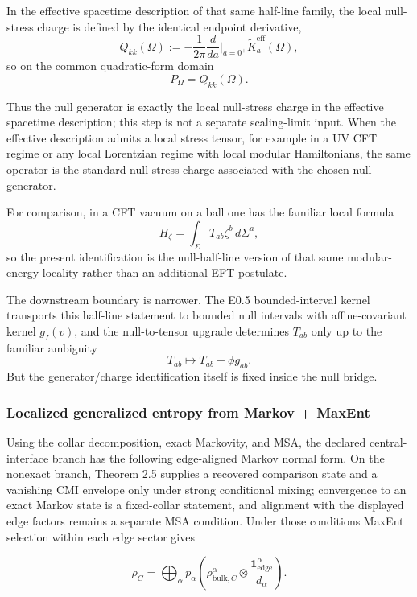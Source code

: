 In the effective spacetime description of that same half-line family, the local null-stress charge is defined by the identical endpoint derivative,
\[
Q_{kk}(\Omega)
:=
-\frac{1}{2\pi}\frac{d}{da}\Big|_{a=0^+}\widetilde K^{\mathrm{eff}}_a(\Omega),
\]
so on the common quadratic-form domain
\[
P_\Omega = Q_{kk}(\Omega).
\]

Thus the null generator is exactly the local null-stress charge in the effective spacetime description; this step is not a separate scaling-limit input. When the effective description admits a local stress tensor, for example in a UV CFT regime or any local Lorentzian regime with local modular Hamiltonians, the same operator is the standard null-stress charge associated with the chosen null generator.

For comparison, in a CFT vacuum on a ball one has the familiar local formula
\[
H_{\zeta}=\int_{\Sigma}T_{ab}\zeta^b\,d\Sigma^a,
\]
so the present identification is the null-half-line version of that same modular-energy locality rather than an additional EFT postulate.

The downstream boundary is narrower. The E0.5 bounded-interval kernel transports this half-line statement to bounded null intervals with affine-covariant kernel \(g_I(v)\), and the null-to-tensor upgrade determines \(T_{ab}\) only up to the familiar ambiguity
\[
T_{ab}\mapsto T_{ab}+\phi g_{ab}.
\]
But the generator/charge identification itself is fixed inside the null bridge.

\subsubsection{Localized generalized entropy from Markov + MaxEnt}\label{54-localized-generalized-entropy-from-markov--maxent}

Using the collar decomposition, exact Markovity, and MSA, the declared central-interface branch has the following edge-aligned Markov normal form. On the nonexact branch, Theorem 2.5 supplies a recovered comparison state and a vanishing CMI envelope only under strong conditional mixing; convergence to an exact Markov state is a fixed-collar statement, and alignment with the displayed edge factors remains a separate MSA condition. Under those conditions MaxEnt selection within each edge sector gives

\[
\rho_C = \bigoplus_{\alpha} p_{\alpha}
\left(\rho_{\mathrm{bulk},C}^{\alpha} \otimes \frac{\mathbf 1_{\mathrm{edge}}^{\alpha}}{d_{\alpha}}\right).
\]

